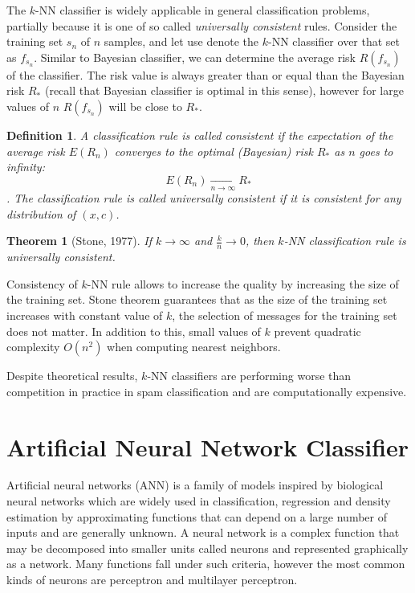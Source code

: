 \documentclass[12pt]{report}
\newtheorem{theorem}{Theorem}[section]
\newtheorem{definition}{Definition}[section]
\begin{document}
The $k$-NN classifier is widely applicable in general classification problems, partially because it is one of so called \textit{universally consistent} rules. Consider the training set $s_n$ of $n$ samples, and let use denote the $k$-NN classifier over that set as $f_{s_n}$. Similar to Bayesian classifier, we can determine the average risk $R(f_{s_n})$ of the classifier. The risk value is always greater than or equal than the Bayesian risk $R_*$ (recall that Bayesian classifier is optimal in this sense), however for large values of $n$ $R(f_{s_n})$ will be close to $R_*$.

\begin{definition}
	A classification rule is called consistent if the expectation of the average risk $E(R_n)$ converges to the optimal (Bayesian) risk $R_*$ as $n$ goes to infinity:
	$$E(R_n) \xrightarrow[n \rightarrow \infty]{} R_*$$.
	The classification rule is called universally consistent if it is consistent for any distribution of $(x, c)$.
\end{definition}

\begin{theorem}[Stone, 1977]
	If $k \rightarrow \infty$ and $\frac{k}{n} \rightarrow 0$, then $k$-NN classification rule is universally consistent.
\end{theorem}

Consistency of $k$-NN rule allows to increase the quality by increasing the size of the training set. Stone theorem guarantees that as the size of the training set increases with constant value of $k$, the selection of messages for the training set does not matter. In addition to this, small values of $k$ prevent quadratic complexity $O(n^2)$ when computing nearest neighbors.

Despite theoretical results, $k$-NN classifiers are performing worse than competition in practice in spam classification and are computationally expensive.

\newpage

\section{Artificial Neural Network Classifier}

Artificial neural networks (ANN) is a family of models inspired by biological neural networks which are widely used in classification, regression and density estimation by approximating functions that can depend on a large number of inputs and are generally unknown. A neural network is a complex function that may be decomposed into smaller units called neurons and represented graphically as a network. Many functions fall under such criteria, however the most common kinds of neurons are perceptron and multilayer perceptron.
\end{document}

